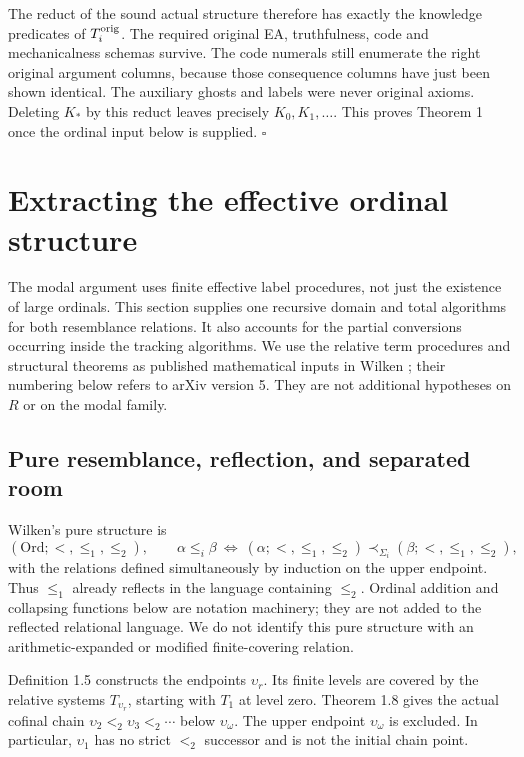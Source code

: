 \documentclass[11pt]{article}
\newcommand{\up}{\upsilon}
\newcommand{\qed}{\hfill\ensuremath{\square}}
\begin{document}
The reduct of the sound actual structure therefore has exactly the
knowledge predicates of $T_i^{\rm orig}$. The required original EA,
truthfulness, code and mechanicalness schemas survive. The code
numerals still enumerate the right original argument columns,
because those consequence columns have just been shown identical.
The auxiliary ghosts and labels were never original axioms. Deleting
$K_*$ by this reduct leaves precisely $K_0,K_1,\ldots$. This proves
Theorem 1 once the ordinal input below is supplied. \qed

\section{Extracting the effective ordinal structure}\label{sec:ordinals}

The modal argument uses finite effective label procedures, not just
the existence of large ordinals. This section supplies one recursive
domain and total algorithms for both resemblance relations. It also
accounts for the partial conversions occurring inside the tracking
algorithms. We use the relative term procedures and structural
theorems as published mathematical inputs in Wilken
\cite{Wilken}; their numbering below refers to arXiv version 5.
They are not additional hypotheses on $R$ or on the modal family.

\subsection{Pure resemblance, reflection, and separated room}

Wilken's pure structure is
\[
 (\mathrm{Ord};<,\le_1,\le_2),
 \qquad
 \alpha\le_i\beta\ \Longleftrightarrow\
 (\alpha;<,\le_1,\le_2)\prec_{\Sigma_i}
 (\beta;<,\le_1,\le_2),
\]
with the relations defined simultaneously by induction on the upper
endpoint. Thus $\le_1$ already reflects in the language containing
$\le_2$. Ordinal addition and collapsing functions below are notation
machinery; they are not added to the reflected relational language.
We do not identify this pure structure with an arithmetic-expanded
or modified finite-covering relation.

Definition 1.5 constructs the endpoints $\up_r$. Its finite levels
are covered by the relative systems $T_{\up_r}$, starting with
$T_1$ at level zero. Theorem 1.8 gives the actual cofinal chain
$\up_2<_2\up_3<_2\cdots$ below $\up_\omega$. The upper endpoint
$\up_\omega$ is excluded. In particular, $\up_1$ has no strict
$<_2$ successor and is not the initial chain point.
\end{document}
